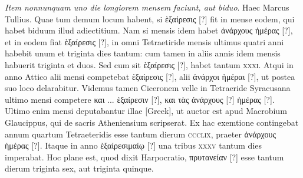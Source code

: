 \emph{Item nonnunquam uno die longiorem
mensem faciunt, aut biduo}.
Haec Marcus Tullius.
Quae tum demum
locum habent, si \textgreek{ὲξαίρεσις [?]} fit in mense eodem,
 qui habet biduum illud
adiectitium.
Nam si mensis idem habet \textgreek{ἀνάρχους ἡμέρας [?]}, et in eodem
fiat \textgreek{ὲξαίρεσις [?]}, in omni Tetraetiride mensis ultimus quatri anni
 habebit
unum et triginta dies tantum: cum tamen in aliis annis idem mensis habuerit
triginta et duos.
Sed cum sit \textgreek{ὲξαίρεσις [?]}, habet tantum \textsc{xxxi}.
Atqui
in anno Attico alii mensi competebat \textgreek{ὲξαίρεσις [?]}, alii
 \textgreek{ἀνάρχοι ἡμέραι [?]}, ut postea
suo loco delarabitur.
Videmus tamen Ciceronem velle in Tetraeride
Syracusana ultimo mensi competere \textgreek{και ... ὲξαίρεσιν [?]},
 \textgreek{και τὰς ἀνάρχους [?]}
\textgreek{ἡμέρας [?]}.
Ultimo enim mensi deputabantur illae \textgreek{[Greek]},
ut auctor est apud Macrobium Glaucippus, qui de sacris Atheniensium
scripserat.
Ex hac exemtione contingebat annum quartum Tetraeteridis
esse tantum dierum \textsc{ccclix}, praeter \textgreek{ἀνάρχους ἡμέρας [?]}.
Itaque in anno
\textgreek{ὲξαίρεσιμαίῳ [?]} una tribus \textsc{xxxv} tantum dies imperabat.
Hoc plane est,
quod dixit Harpocratio, \textgreek{πρυτανείαν [?]} esse tantum
 dierum triginta sex, aut
triginta quinque.

